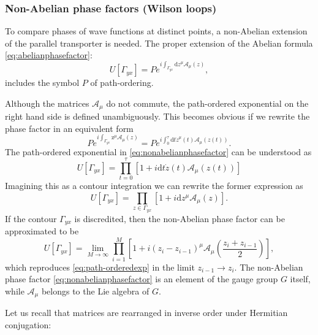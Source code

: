 \subsubsection{Non-Abelian phase factors (Wilson loops)}
  To compare phases of wave functions at distinct points, a non-Abelian
  extension of the parallel transporter is needed. The proper extension of the
  Abelian formula \eqref{eq:abelianphasefactor}:
\begin{equation}
  U\left[\Gamma_{yx}\right]
  = Pe^{i\int_{\Gamma_{yx}}\mathrm{d}z^\mu\mathcal{A}_\mu(z)},
  \label{eq:nonabelianphasefactor}
\end{equation}
includes the symbol $P$ of path-ordering.
\par Although the matrices $\mathcal{A}_\mu$ do not commute, the path-ordered
exponential on the right hand side is defined unambiguously. This becomes obvious if
we rewrite the phase factor in an equivalent form
\begin{equation}
Pe^{i\int_{\Gamma_{yx}}\mathrm{z}^\mu\mathcal{A}_\mu(z)}
= Pe^{i\int_0^\tau\mathrm{d}t\dot{z}^\mu(t)\mathcal{A}_\mu(z(t))}.
\end{equation}
The path-ordered exponential in \eqref{eq:nonabelianphasefactor} can be
understood as
\begin{equation}
  U\left[\Gamma_{yx}\right]
  = \prod_{t=0}^{\tau}\left[1+i\mathrm{d}t\dot{z}(t)\mathcal{A}_\mu(z(t))\right]
\end{equation}
Imagining this as a contour integration we can rewrite the former expression as
\begin{equation}
  U\left[\Gamma_{yx}\right]
  = \prod_{z\in{\Gamma_{yx}}}\left[1+i\mathrm{d}z^\mu\mathcal{A_\mu}(z)\right].
  \label{eq:path-orderedexp}
\end{equation}
If the contour $\Gamma_{yx}$ is discredited, then the non-Abelian phase factor
can be approximated to be
\begin{equation}
  U\left[\Gamma_{yx}\right]
  = \lim_{M\rightarrow\infty}\prod_{i=1}^{M}\left[1+i(z_i-z_{i-1})^\mu\mathcal{A}_\mu\left(\frac{z_i+z_{i-1}}{2}\right)\right],
  \label{eq:discretizedphasefactoraprrox}
\end{equation}
which reproduces \eqref{eq:path-orderedexp} in the limit $z_{i-1}\rightarrow
z_i$.
The non-Abelian phase factor \eqref{eq:nonabelianphasefactor} is an element of
the gauge group $G$ itself, while $\mathcal{A}_\mu$ belongs to the Lie algebra
of $G$.
\par Let us recall that matrices are rearranged in inverse order under
Hermitian conjugation:
